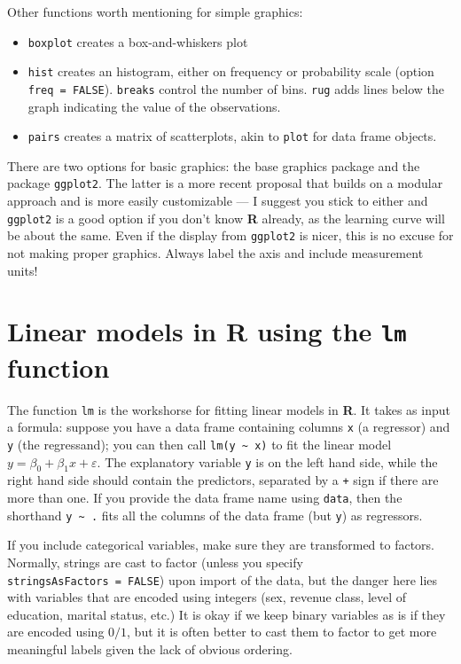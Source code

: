 \documentclass[
  11pt,
  letterpaper,
]{book}
\makeatletter
\providecommand{\tightlist}{%
  \setlength{\itemsep}{0pt}\setlength{\parskip}{0pt}}
\newenvironment{kframe}{%
\medskip{}
\setlength{\fboxsep}{.8em}
 \def\at@end@of@kframe{}%
 \ifinner\ifhmode%
  \def\at@end@of@kframe{\end{minipage}}%
  \begin{minipage}{\columnwidth}%
 \fi\fi%
 \def\FrameCommand##1{\hskip\@totalleftmargin \hskip-\fboxsep
 \colorbox{shadecolor}{##1}\hskip-\fboxsep
     \hskip-\linewidth \hskip-\@totalleftmargin \hskip\columnwidth}%
 \MakeFramed {\advance\hsize-\width
   \@totalleftmargin\z@ \linewidth\hsize
   \@setminipage}}%
 {\par\unskip\endMakeFramed%
 \at@end@of@kframe}
\newenvironment{rmdblock}[1]
  {
  \begin{itemize}
  \renewcommand{\labelitemi}{
    \raisebox{-.7\height}[0pt][0pt]{
      {\setkeys{Gin}{width=3em,keepaspectratio}\texttt{[image: images/\#1]}}
    }
  }
  \setlength{\fboxsep}{1em}
  \begin{kframe}
  \item
  }
  {
  \end{kframe}
  \end{itemize}
  }
\newenvironment{rmdnote}
  {\begin{rmdblock}{note}}
  {\end{rmdblock}}
\theoremstyle{definition}
\theoremstyle{definition}
\theoremstyle{definition}
\theoremstyle{remark}
\makeatother
\begin{document}
Other functions worth mentioning for simple graphics:

\begin{itemize}
\tightlist
\item
  \texttt{boxplot} creates a box-and-whiskers plot
\item
  \texttt{hist} creates an histogram, either on frequency or probability scale (option \texttt{freq\ =\ FALSE}). \texttt{breaks} control the number of bins. \texttt{rug} adds lines below the graph indicating the value of the observations.
\item
  \texttt{pairs} creates a matrix of scatterplots, akin to \texttt{plot} for data frame objects.
\end{itemize}

\begin{rmdnote}
There are two options for basic graphics: the base graphics package and the package \texttt{ggplot2}. The latter is a more recent proposal that builds on a modular approach and is more easily customizable --- I suggest you stick to either and \texttt{ggplot2} is a good option if you don't know \textbf{R} already, as the learning curve will be about the same. Even if the display from \texttt{ggplot2} is nicer, this is no excuse for not making proper graphics. Always label the axis and include measurement units!
\end{rmdnote}

\hypertarget{rlmfunc}{%
\section{\texorpdfstring{Linear models in \textbf{R} using the \texttt{lm} function}{Linear models in R using the lm function}}\label{rlmfunc}}

The function \texttt{lm} is the workshorse for fitting linear models in \textbf{R}. It takes as input a formula: suppose you have a data frame containing columns \texttt{x} (a regressor) and \texttt{y} (the regressand); you can then call \texttt{lm(y\ \textasciitilde{}\ x)} to fit the linear model \(y = \beta_0 + \beta_1 x + \varepsilon\). The explanatory variable \texttt{y} is on the left hand side,
while the right hand side should contain the predictors, separated by a \texttt{+} sign if there are more than one.
If you provide the data frame name using \texttt{data}, then the shorthand \texttt{y\ \textasciitilde{}\ .} fits all the columns of the data frame (but \texttt{y}) as regressors.

If you include categorical variables, make sure they are transformed to factors. Normally, strings are cast to factor (unless you specify \texttt{stringsAsFactors\ =\ FALSE}) upon import of the data, but the danger here lies with variables that are encoded using integers (sex, revenue class, level of education, marital status, etc.) It is okay if we keep binary variables as is if they are encoded using \(0/1\), but it is often better to cast them to factor to get more meaningful labels given the lack of obvious ordering.
\end{document}

